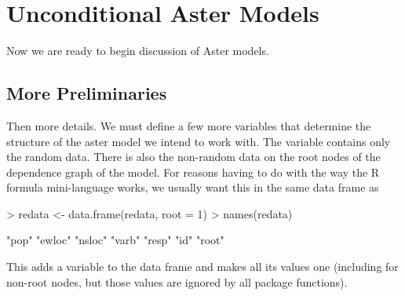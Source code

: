 \documentclass[11pt]{article}
\begin{document}
\section{Unconditional Aster Models}

Now we are ready to begin discussion of Aster models.

\subsection{More Preliminaries}

Then more details.  We must define a few more variables that determine
the structure of the aster model we intend to work with.  The variable
\verb@resp@ contains only the random data.  There is also the non-random
data on the root nodes of the dependence graph of the model.  For reasons
having to do with the way the R formula mini-language works, we usually
want this in the same data frame as \verb@resp@
\begin{Schunk}
\begin{Sinput}
> redata <- data.frame(redata, root = 1)
> names(redata)
\end{Sinput}
\begin{Soutput}
[1] "pop"   "ewloc" "nsloc" "varb"  "resp"  "id"    "root" 
\end{Soutput}
\end{Schunk}
This adds a variable \verb@root@ to the data frame and makes all its values
one (including for non-root nodes, but those values are ignored by
all \verb@aster@ package functions).
\end{document}
